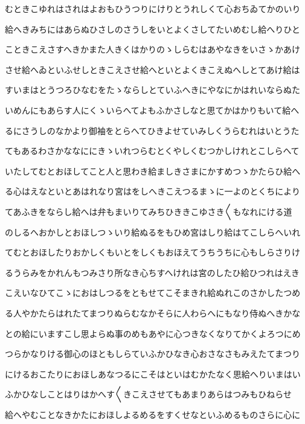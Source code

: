 \documentclass[a4paper,11pt,landscape]{ltjtarticle}
\begin{document}
\par\medskip
むときこゆれはされはよおもひうつりにけりとうれしくて心おちゐてかのいり
\par\medskip
給へきみちにはあらぬひさしのさうしをいとよくさしてたいめむし給へりひと
\par\medskip
こときこえさすへきかまた人きくはかりのゝしらむはあやなきをいさゝかあけ
\par\medskip
させ給へゐといふせしときこえさせ給へといとよくきこえぬへしとてあけ給は
\par\medskip
すいまはとうつろひなむをたゝならしとていふへきにやなにかはれいならぬた
\par\medskip
いめんにもあらす人にくゝいらへてよもふかさしなと思てかはかりもいて給へ
\par\medskip
るにさうしのなかより御袖をとらへてひきよせていみしくうらむれはいとうた
\par\medskip
てもあるわさかななににきゝいれつらむとくやしくむつかしけれとこしらへて
\par\medskip
いたしてむとおほしてこと人と思わき給ましきさまにかすめつゝかたらひ給へ
\par\medskip
る心はえなといとあはれなり宮はをしへきこえつるまゝに一よのとくちにより
\par\medskip
てあふきをならし給へは弁もまいりてみちひききこゆさき〱もなれにける道
\par\medskip
のしるへおかしとおほしつゝいり給ぬるをもひめ宮はしり給はてこしらへいれ
\par\medskip
てむとおほしたりおかしくもいとをしくもおほえてうちうちに心もしらさりけ
\par\medskip
るうらみをかれんもつみさり所なき心ちすへけれは宮のしたひ給ひつれはえき
\par\medskip
こえいなひてこゝにおはしつるをともせてこそまきれ給ぬれこのさかしたつめ
\par\medskip
る人やかたらはれたてまつりぬらむなかそらに人わらへにもなり侍ぬへきかな
\par\medskip
との給にいますこし思よらぬ事のめもあやに心つきなくなりてかくよろつにめ
\par\medskip
つらかなりける御心のほともしらていふかひなき心おさなさもみえたてまつり
\par\medskip
にけるおこたりにおほしあなつるにこそはといはむかたなく思給へりいまはい
\par\medskip
ふかひなしことはりはかへす〱きこえさせてもあまりあらはつみもひねらせ
\par\medskip
給へやむことなきかたにおほしよるめるをすくせなといふめるものさらに心に
\end{document}
